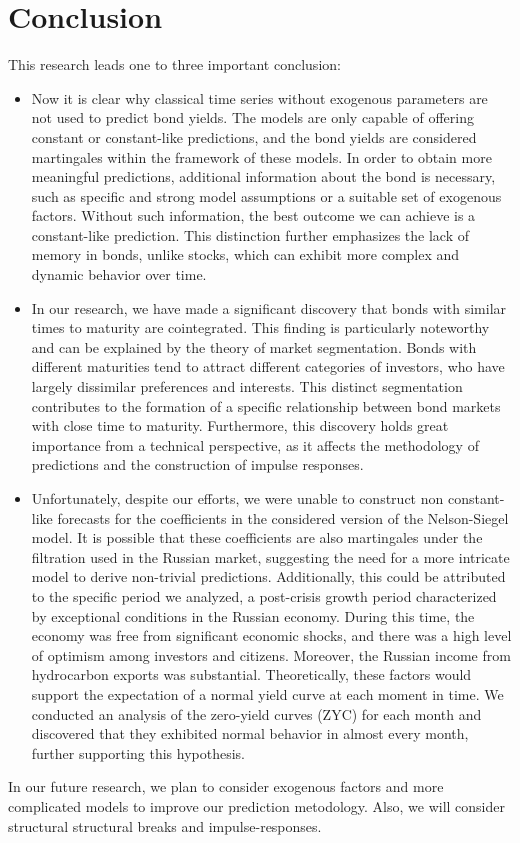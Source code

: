 \documentclass{vegaarticle}
\begin{document}
    \section{Conclusion}
        \par
        This research leads one to three important conclusion:
        \begin{itemize}
            \item Now it is clear why classical time series without exogenous parameters are not used to predict bond yields. 
            The models are only capable of offering constant or constant-like predictions, and the bond yields are considered 
            martingales within the framework of these models. In order to obtain more meaningful predictions, additional 
            information about the bond is necessary, such as specific and strong model assumptions or a suitable set of exogenous 
            factors. Without such information, the best outcome we can achieve is a constant-like prediction. This distinction 
            further emphasizes the lack of memory in bonds, unlike stocks, which can exhibit more complex and dynamic behavior over time.
            \item In our research, we have made a significant discovery that bonds with similar times to maturity are cointegrated. 
            This finding is particularly noteworthy and can be explained by the theory of market segmentation. 
            Bonds with different maturities tend to attract different categories of investors, who have largely 
            dissimilar preferences and interests. This distinct segmentation contributes to the formation of a specific relationship 
            between bond markets with close time to maturity. Furthermore, this discovery holds great importance from a technical perspective,
             as it affects the methodology of predictions and the construction of impulse responses.
            \item Unfortunately, despite our efforts, we were unable to construct non constant-like forecasts for the coefficients 
            in the considered version of the Nelson-Siegel model. It is possible that these coefficients are also martingales under the 
            filtration used in the Russian market, suggesting the need for a more intricate model to derive non-trivial predictions. 
            Additionally, this could be attributed to the specific period we analyzed, a post-crisis growth period characterized 
            by exceptional conditions in the Russian economy. During this time, the economy was free from significant economic shocks, 
            and there was a high level of optimism among investors and citizens. Moreover, the Russian income from hydrocarbon exports was substantial. 
            Theoretically, these factors would support the expectation of a normal yield curve at each moment in time. 
            We conducted an analysis of the zero-yield curves (ZYC) for each month and discovered that they exhibited normal 
            behavior in almost every month, further supporting this hypothesis.
        \end{itemize}
        In our future research, we plan to consider exogenous factors and more complicated models to improve our prediction metodology.
        Also, we will consider structural structural breaks and impulse-responses. 

\end{document}

